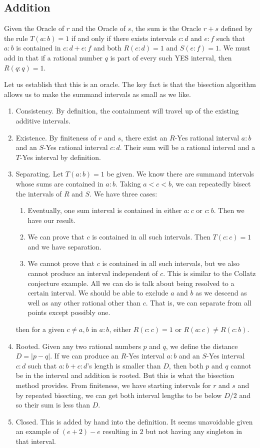 \documentclass[12pt]{article}
\theoremstyle{remark}
\begin{document}
\subsection{Addition}

Given the Oracle of $r$ and the Oracle of $s$, the sum is the Oracle $r+s$ defined by the rule $T(a:b) = 1$ if and only if there exists intervals $c:d$ and $e:f$ such that $a:b$ is contained in $c:d + e:f$ and both $R(c:d)=1$ and $S(e:f) = 1$. We must add in that if a rational number $q$ is part of every such YES interval, then $R(q:q) = 1$.

Let us establish that this is an oracle. The key fact is that the bisection algorithm allows us to make the summand intervals as small as we like. 

\begin{enumerate}
    \item Consistency. By definition, the containment will travel up of the existing additive intervals.
    \item Existence. By finiteness of $r$ and $s$, there exist an $R$-Yes rational interval $a:b$ and an $S$-Yes rational interval $c:d$. Their sum will be a rational interval and a $T$-Yes interval by definition.
    \item Separating. Let $T(a:b)=1$ be given. We know there are summand intervals whose sums are contained in $a:b$. Taking $a < c< b$, we can repeatedly bisect the intervals of $R$ and $S$. We have three cases: 
    \begin{enumerate}
        \item Eventually, one sum interval is contained in either $a:c$ or $c:b$. Then we have our result. 
        \item We can prove that $c$ is contained in all such intervals. Then $T(c:c) =1$ and we have separation. 
        \item We cannot prove that $c$ is contained in all such intervals, but we also cannot produce an interval independent of $c$. This is similar to the Collatz conjecture example. All we can do is talk about being resolved to a certain interval. We should be able to exclude $a$ and $b$ as we descend as well as any other rational other than $c$. That is, we can separate from all points except possibly one. 
    \end{enumerate}
    then for a given $c \neq a, b$ in $a:b$, either $R(c:c) = 1$ or $R(a:c) \neq R(c:b)$. 
    \item Rooted. Given any two rational numbers $p$ and $q$, we define the distance $D = |p-q|$. If we can produce an $R$-Yes interval $a:b$ and an $S$-Yes interval $c:d$ such that $a:b + c:d$'s length is smaller than $D$, then both $p$ and $q$ cannot be in the interval and addition is rooted. But this is what the bisection method provides. From finiteness, we have starting intervals for $r$ and $s$ and by repeated bisecting, we can get both interval lengths to be below $D/2$ and so their sum is less than $D$.
    \item Closed. This is added by hand into the definition. It seems unavoidable given an example of $(e + 2) - e$ resulting in $2$ but not having any singleton in that interval. 
\end{enumerate}
\end{document}
